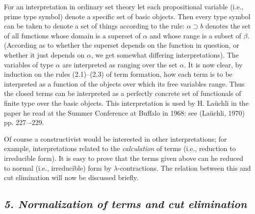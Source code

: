\documentclass[12pt]{article}
\def\l{\lambda}
\def\limp{\supset}
\def\a{\alpha}
\def\b{\beta}
\begin{document}
For an interpretation in ordinary set theory let each propositional variable (i.e., prime type symbol) denote a specific set of basic
objects. Then every type symbol can be taken to denote a set of things according to the rule: $\a \limp b$ 
denotes the set of all functions whose domain is a superset of $\a$ and whose range is a subset of $\b$. (According as to whether the superset depends on the function in question, or whether it just depends on $\a$, we get somewhat differing interpretations). 
The variables of type $\a$ are interpreted as ranging over the set $\a$. It is now clear, by induction on the rules (2.1)--(2.3) of term formation, how each term is to be interpreted as a function of the objects over which its free variables range. Thus the closed terms can be interpreted as a perfectly concrete set of functionals of finite type over the basic objects. This interpretation is used by H. Laüchli in the paper he read at the Summer Conference at Buffalo in 1968: see (Laüchli, 1970) pp. 227–-229.

Of course a constructivist would be interested in other interpretations; for example, interpretations related to the {\it calculation}
of terms (i.e., reduction to irreducible form). It is easy to prove that the terms given above can he reduced to normal 
(i.e., irreducible) form by $\l$-contractions. The relation between this and cut elimination will now be discussed briefly.

\subsection{\it 5. Normalization of terms and cut elimination}
\end{document}
